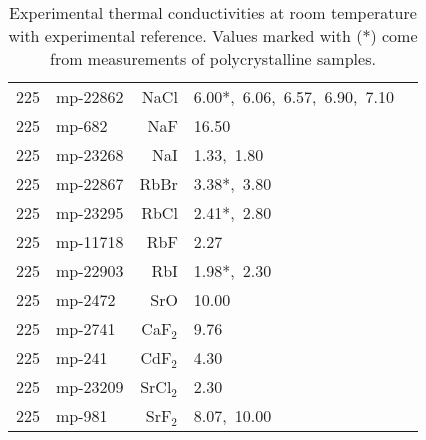 \begin{table*}[ht]
\begin{center}
\begin{tabular}{rlrll}
     225 &    mp-22862 &          NaCl &            6.00*,~6.06,~6.57,~6.90,~7.10 &   \cite{Hakansson.1986,Macpherson.1983,li1981,touloukian1971,Morelli.2006} \\
     225 &      mp-682 &           NaF &           16.50 &     \cite{Morelli.2006} \\
     225 &    mp-23268 &           NaI &            1.33,~1.80 &   \cite{Hakansson.1986,Morelli.2006} \\
     225 &    mp-22867 &          RbBr &            3.38*,~3.80 &   \cite{Andersson.1985,Morelli.2006} \\
     225 &    mp-23295 &          RbCl &            2.41*,~2.80 & \cite{Andersson.1985,Morelli.2006} \\
     225 &    mp-11718 &           RbF &            2.27 &   \cite{Hakansson.1989} \\
     225 &    mp-22903 &           RbI &            1.98*,~2.30 & \cite{Andersson.1985,Morelli.2006} \\
     225 &     mp-2472 &           SrO &           10.00 &     \cite{Morelli.2006} \\
     225 &     mp-2741 &       CaF$_2$ &            9.76 &       \cite{Popov.2010} \\
     225 &      mp-241 &       CdF$_2$ &            4.30 &       \cite{Popov.2010} \\
     225 &    mp-23209 &      SrCl$_2$ &            2.30 &       \cite{moore1985} \\
     225 &      mp-981 &       SrF$_2$ &            8.07,~10.00 & \cite{moore1985,Popov.2010} \\
\bottomrule
\end{tabular}
\end{center}
   \caption{Experimental thermal conductivities at room temperature with experimental reference. Values marked with ($\ast$) come from measurements of polycrystalline samples. }
   \label{tab:kappa.exp}
 \end{table*}